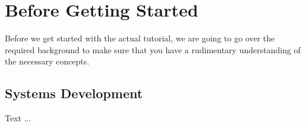 \section{Before Getting Started}
\label{tutorial_06}

Before we get started with the actual tutorial, we are going to go over the required background to make sure that you have a rudimentary understanding of the necessary concepts.


\subsection{Systems Development}

Text ...
